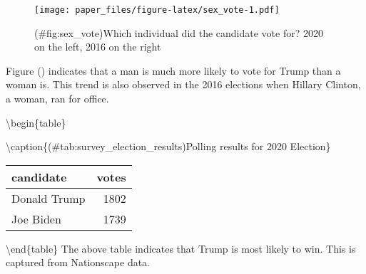 \documentclass[
]{article}
\newenvironment{Shaded}{\begin{snugshade}}{\end{snugshade}}
\newcommand{\DataTypeTok}[1]{\textcolor[rgb]{0.13,0.29,0.53}{#1}}
\newcommand{\DecValTok}[1]{\textcolor[rgb]{0.00,0.00,0.81}{#1}}
\newcommand{\KeywordTok}[1]{\textcolor[rgb]{0.13,0.29,0.53}{\textbf{#1}}}
\newcommand{\NormalTok}[1]{#1}
\newcommand{\OperatorTok}[1]{\textcolor[rgb]{0.81,0.36,0.00}{\textbf{#1}}}
\newcommand{\StringTok}[1]{\textcolor[rgb]{0.31,0.60,0.02}{#1}}
\begin{document}
\begin{figure}
\centering
\texttt{[image: paper\_files/figure-latex/sex\_vote-1.pdf]}
\caption{(\#fig:sex\_vote)Which individual did the candidate vote for? 2020 on the left, 2016 on the right}
\end{figure}

Figure (\citet{fig}) indicates that a man is much more likely to vote for Trump than a woman is. This trend is also observed in the 2016 elections when Hillary Clinton, a woman, ran for office.

\begin{Shaded}
\end{Shaded}

\textbackslash begin\{table\}

\textbackslash caption\{(\#tab:survey\_election\_results)Polling results for 2020 Election\}
\centering

\begin{tabular}[t]{l|r}
\hline
candidate & votes\\
\hline
Donald Trump & 1802\\
\hline
Joe Biden & 1739\\
\hline
\end{tabular}

\textbackslash end\{table\}
The above table indicates that Trump is most likely to win. This is captured from Nationscape data.

\begin{Shaded}
\end{Shaded}
\end{document}
